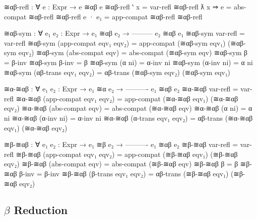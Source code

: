 \documentclass{lecturenotes}
\begin{document}
\begin{itemize}
\begin{code}
≅αβ-refl : ∀ {e : Expr} → e ≅αβ e
≅αβ-refl {‵ x} = var-refl
≅αβ-refl {ƛ x ⇒ e} = abs-compat ≅αβ-refl
≅αβ-refl {e · e₁} = app-compat ≅αβ-refl ≅αβ-refl

≅αβ-sym : ∀ {e₁ e₂ : Expr} →
  e₁ ≅αβ e₂ →
  ---------
  e₂ ≅αβ e₁
≅αβ-sym var-refl = var-refl
≅αβ-sym (app-compat eqv₁ eqv₂) = app-compat (≅αβ-sym eqv₁) (≅αβ-sym eqv₂)
≅αβ-sym (abs-compat eqv) = abs-compat (≅αβ-sym eqv)
≅αβ-sym β = β-inv
≅αβ-sym β-inv = β
≅αβ-sym (α ni) = α-inv ni
≅αβ-sym (α-inv ni) = α ni
≅αβ-sym (αβ-trans eqv₁ eqv₂) = αβ-trans (≅αβ-sym eqv₂) (≅αβ-sym eqv₁)

≅α-≅αβ : ∀ {e₁ e₂ : Expr} →
  e₁ ≅α  e₂ →
  ----------
  e₁ ≅αβ e₂
≅α-≅αβ var-refl = var-refl
≅α-≅αβ (app-compat eqv₁ eqv₂) = app-compat (≅α-≅αβ eqv₁) (≅α-≅αβ eqv₂)
≅α-≅αβ (abs-compat eqv) = abs-compat (≅α-≅αβ eqv)
≅α-≅αβ (α ni) = α ni
≅α-≅αβ (α-inv ni) = α-inv ni
≅α-≅αβ (α-trans eqv₁ eqv₂) = αβ-trans (≅α-≅αβ eqv₁) (≅α-≅αβ eqv₂)

≅β-≅αβ : ∀ {e₁ e₂ : Expr} →
  e₁ ≅β  e₂ →
  ----------
  e₁ ≅αβ e₂
≅β-≅αβ var-refl = var-refl
≅β-≅αβ (app-compat eqv₁ eqv₂) = app-compat (≅β-≅αβ eqv₁) (≅β-≅αβ eqv₂)
≅β-≅αβ (abs-compat eqv) = abs-compat (≅β-≅αβ eqv)
≅β-≅αβ β = β
≅β-≅αβ β-inv = β-inv
≅β-≅αβ (β-trans eqv₁ eqv₂) = αβ-trans (≅β-≅αβ eqv₁) (≅β-≅αβ eqv₂)    
\end{code}
\end{itemize}

\subsection{$\beta$ Reduction}
\label{sec:beta-reduction}
\end{document}
